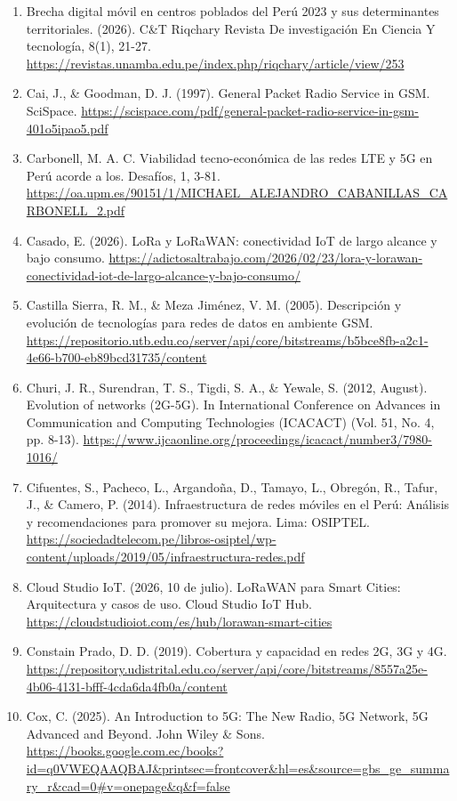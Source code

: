 \documentclass[12pt,a4paper]{article}
\begin{document}
\begin{enumerate}
    \item Brecha digital móvil en centros poblados del Perú 2023 y sus determinantes territoriales. (2026). C\&T Riqchary Revista De investigación En Ciencia Y tecnología, 8(1), 21-27. \url{https://revistas.unamba.edu.pe/index.php/riqchary/article/view/253}
    \item Cai, J., \& Goodman, D. J. (1997). General Packet Radio Service in GSM. SciSpace. \url{https://scispace.com/pdf/general-packet-radio-service-in-gsm-401o5ipao5.pdf}
    \item Carbonell, M. A. C. Viabilidad tecno-económica de las redes LTE y 5G en Perú acorde a los. Desafíos, 1, 3-81. \url{https://oa.upm.es/90151/1/MICHAEL_ALEJANDRO_CABANILLAS_CARBONELL_2.pdf}
    \item Casado, E. (2026). LoRa y LoRaWAN: conectividad IoT de largo alcance y bajo consumo. \url{https://adictosaltrabajo.com/2026/02/23/lora-y-lorawan-conectividad-iot-de-largo-alcance-y-bajo-consumo/}
    \item Castilla Sierra, R. M., \& Meza Jiménez, V. M. (2005). Descripción y evolución de tecnologías para redes de datos en ambiente GSM. \url{https://repositorio.utb.edu.co/server/api/core/bitstreams/b5bce8fb-a2c1-4e66-b700-eb89bcd31735/content}
    \item Churi, J. R., Surendran, T. S., Tigdi, S. A., \& Yewale, S. (2012, August). Evolution of networks (2G-5G). In International Conference on Advances in Communication and Computing Technologies (ICACACT) (Vol. 51, No. 4, pp. 8-13). \url{https://www.ijcaonline.org/proceedings/icacact/number3/7980-1016/}
    \item Cifuentes, S., Pacheco, L., Argandoña, D., Tamayo, L., Obregón, R., Tafur, J., \& Camero, P. (2014). Infraestructura de redes móviles en el Perú: Análisis y recomendaciones para promover su mejora. Lima: OSIPTEL. \url{https://sociedadtelecom.pe/libros-osiptel/wp-content/uploads/2019/05/infraestructura-redes.pdf}
    \item Cloud Studio IoT. (2026, 10 de julio). LoRaWAN para Smart Cities: Arquitectura y casos de uso. Cloud Studio IoT Hub. \url{https://cloudstudioiot.com/es/hub/lorawan-smart-cities}
    \item Constain Prado, D. D. (2019). Cobertura y capacidad en redes 2G, 3G y 4G. \url{https://repository.udistrital.edu.co/server/api/core/bitstreams/8557a25e-4b06-4131-bfff-4cda6da4fb0a/content}
    \item Cox, C. (2025). An Introduction to 5G: The New Radio, 5G Network, 5G Advanced and Beyond. John Wiley \& Sons. \url{https://books.google.com.ec/books?id=q0VWEQAAQBAJ&printsec=frontcover&hl=es&source=gbs_ge_summary_r&cad=0#v=onepage&q&f=false}

\end{enumerate}
\end{document}
